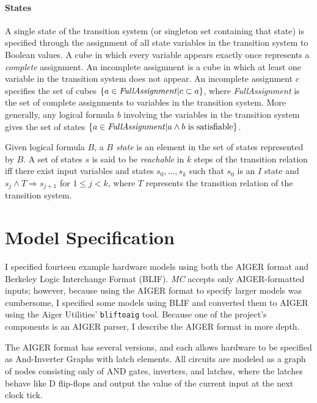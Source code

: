 \documentclass[12pt,a4paper,twoside,openright]{report}
\begin{document}
{\paragraph{States}{
A single state of the transition system (or singleton set containing that state)
is specified through the assignment of all state variables in the transition system
to Boolean values.
A cube in which every variable appears exactly once represents a \emph{complete} assignment.
An incomplete assignment is a cube in which
at least one variable in the transition system does not appear. An incomplete
assignment $c$ specifies the set of cubes $\{a \in{\it FullAssignment}|c \subset a\}$,
where {\it FullAssignment} is the set of complete assignments to variables in the
transition system.
More generally, any logical formula $b$ involving the variables in the transition
system gives the set of states
$\{a \in {\it FullAssignment} | a \wedge b~{\rm is~satisfiable}\}$.

Given logical formula $B$, a \emph{$B$ state} is an element in the set of states
represented
by $B$. A set of states $s$ is said to be \emph{reachable}
in $k$ steps of the transition relation iff there exist input variables and
states $s_0, \ldots, s_k$ such that
$s_0$ is an $I$ state and $s_j \wedge T \Rightarrow s_{j + 1}$ for $1 \leq j < k$,
where $T$ represents the transition relation of the transition system.

}


\section{Model Specification}
\label{prep:aiger}


I specified fourteen example hardware models using
both the AIGER format and Berkeley Logic Interchange Format (BLIF).
\emph{MC} accepts only AIGER-formatted inputs;
however, because using the AIGER format to specify larger models was cumbersome,
I specified some models using BLIF and converted them to AIGER
using the Aiger Utilities' \verb,bliftoaig, tool. Because one of
the project's components is an AIGER parser, I describe the AIGER format
in more depth.

The AIGER format has several versions, and each allows hardware to be
specified as
And-Inverter Graphs with latch elements.
All circuits are modeled as a graph of nodes consisting only of
AND gates, inverters, and latches, where the latches behave like D
flip-flops and output the value of the current input at the next
clock tick.

}
\end{document}
